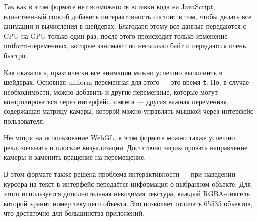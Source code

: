 Так как в этом формате нет возможности вставки кода на JavaScript, единственный способ добавить интерактивность состоит в том, чтобы делать все анимации и вычисления в шейдерах. Благодаря этому все данные передаются с CPU на GPU только один раз, после этого происходит только изменение uniform-переменных, которые занимают по несколько байт и передаются очень быстро.

Как оказалось, практически все анимации можно успешно выполнить в шейдерах. Основная uniform-переменная для этого --- это время \texttt{t}. Но, в случае необходимости, можно добавить и другие переменные, которые могут контролироваться через интерфейс. \texttt{camera} --- другая важная переменная, содержащая матрицу камеры, которой можно управлять мышкой через интерфейс пользователя.

Несмотря на использование WebGL, в этом формате можно также успешно реализовывать и плоские визуализации. Достаточно зафиксировать направление камеры и заменить вращение на перемещение.

В этом формате также решена проблема интерактивности --- при наведении курсора на текст в интерфейс передаётся информация о выбранном объекте. Для этого используется дополнительная невидимая текстура, каждый RGBA-пиксель которой хранит номер текущего объекта. Это позволяет отличать 65535 объектов, что достаточно для большинства приложений.




